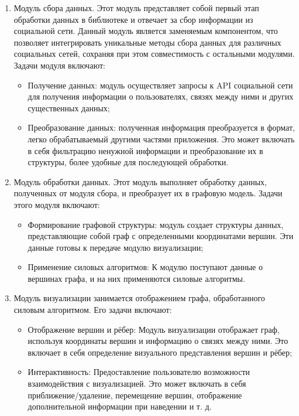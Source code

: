 \documentclass[14pt, russian]{scrartcl}
\begin{document}
\begin{enumerate}
	\item{Модуль сбора данных.
	      Этот модуль представляет собой первый этап обработки данных в библиотеке и отвечает за сбор информации из социальной сети. Данный модуль является заменяемым компонентом, что позволяет интегрировать уникальные методы сбора данных для различных социальных сетей, сохраняя при этом совместимость с остальными модулями. Задачи модуля включают:
	      \begin{itemize}
		      \item{Получение данных: модуль осуществляет запросы к API социальной сети для получения информации о пользователях, связях между ними и других существенных данных;}
		      \item{Преобразование данных: полученная информация преобразуется в формат, легко обрабатываемый другими частями приложения. Это может включать в себя фильтрацию ненужной информации            и преобразование их в структуры, более удобные для последующей обработки.}
	      \end{itemize}
	      }
	\item{Модуль обработки данных.
	      Этот модуль выполняет обработку данных, полученных от модуля сбора, и преобразует их в графовую модель. Задачи этого модуля включают:

	      \begin{itemize}
		      \item Формирование графовой структуры: модуль создает структуры данных, представляющие собой граф с определенными координатами вершин. Эти данные готовы к передаче модулю визуализации;
		      \item Применение силовых алгоритмов: К модулю поступают данные о вершинах графа, и на них применяются силовые алгоритмы.
	      \end{itemize}


	      }
	\item{Модуль визуализации занимается отображением графа, обработанного силовым алгоритмом. Его задачи включают:

	      \begin{itemize}
		      \item Отображение вершин и рёбер: Модуль визуализации отображает граф, используя координаты вершин и информацию о связях между ними. Это включает в себя определение визуального представления вершин и рёбер;
		      \item Интерактивность: Предоставление пользователю возможности взаимодействия с визуализацией. Это может включать в себя приближение/удаление, перемещение вершин, отображение дополнительной информации при наведении и т. д.
	      \end{itemize}
	      }

\end{enumerate}
\end{document}
